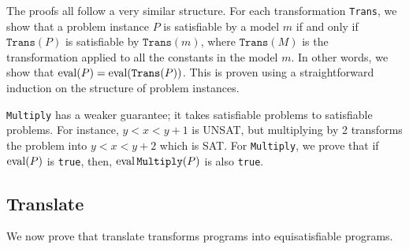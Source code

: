The proofs all follow a very similar structure. For each transformation
\texttt{Trans}, we show that a problem instance $P$ is satisfiable by a model $m$
if and only if $\texttt{Trans}(P)$ is satisfiable by $\texttt{Trans}(m)$, where
$\texttt{Trans}(M)$ is the transformation applied to all the constants in the
model $m$. In other words, we show that $\operatorname{eval} (P) = \operatorname{eval} (\texttt{Trans}(P))$.
This is proven using a straightforward induction on the structure of problem
instances.

\texttt{Multiply} has a weaker guarantee; it takes satisfiable problems to
satisfiable problems. For instance, $y<x<y+1$ is UNSAT, but multiplying by 2
transforms the problem into $y<x<y+2$ which is SAT. For \texttt{Multiply}, we
prove that if $\operatorname{eval} (P)$ is \texttt{true}, then, $\operatorname{eval} \texttt{Multiply}(P)$
is also \texttt{true}.

\subsection{Translate}
We now prove that translate transforms programs into equisatisfiable programs.
